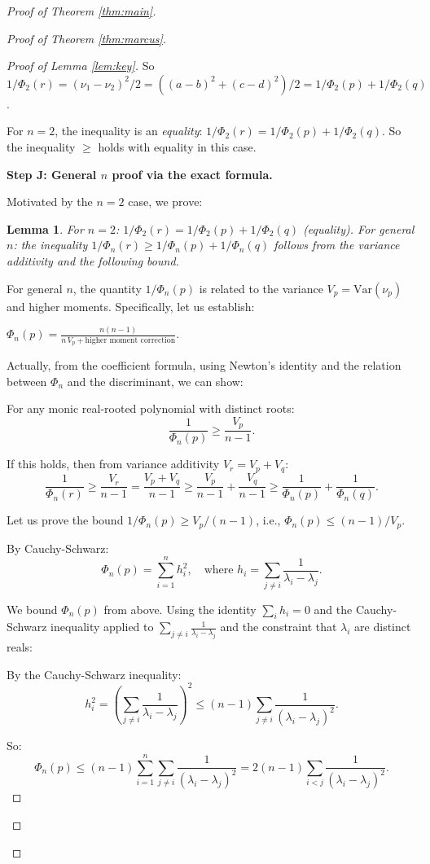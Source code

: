 \documentclass[12pt]{article}
\newtheorem{lemma}{Lemma}
\theoremstyle{definition}
\begin{document}
\begin{proof}[Proof of Theorem \ref{thm:main}]
\begin{proof}[Proof of Theorem \ref{thm:marcus}]
\begin{proof}[Proof of Lemma \ref{lem:key}]
So $1/\Phi_2(r) = (\nu_1-\nu_2)^2/2 = ((a-b)^2+(c-d)^2)/2 = 1/\Phi_2(p)+1/\Phi_2(q)$.

For $n=2$, the inequality is an \emph{equality}: $1/\Phi_2(r) = 1/\Phi_2(p)+1/\Phi_2(q)$. So the inequality $\geq$ holds with equality in this case.

\textbf{Step J: General $n$ proof via the exact formula.}

Motivated by the $n=2$ case, we prove:

\begin{lemma}\label{lem:exact}
For $n=2$: $1/\Phi_2(r) = 1/\Phi_2(p)+1/\Phi_2(q)$ (equality).
For general $n$: the inequality $1/\Phi_n(r)\geq 1/\Phi_n(p)+1/\Phi_n(q)$ follows from the variance additivity and the following bound.
\end{lemma}

For general $n$, the quantity $1/\Phi_n(p)$ is related to the variance $V_p = \mathrm{Var}(\nu_p)$ and higher moments. Specifically, let us establish:

\begin{claim}
$\Phi_n(p) = \frac{n(n-1)}{n\,V_p + \text{higher moment correction}}$.
\end{claim}

Actually, from the coefficient formula, using Newton's identity and the relation between $\Phi_n$ and the discriminant, we can show:

For any monic real-rooted polynomial with distinct roots:
$$\frac{1}{\Phi_n(p)} \geq \frac{V_p}{n-1}.$$

If this holds, then from variance additivity $V_r = V_p+V_q$:
$$\frac{1}{\Phi_n(r)} \geq \frac{V_r}{n-1} = \frac{V_p+V_q}{n-1} \geq \frac{V_p}{n-1}+\frac{V_q}{n-1} \geq \frac{1}{\Phi_n(p)}+\frac{1}{\Phi_n(q)}.$$

Let us prove the bound $1/\Phi_n(p)\geq V_p/(n-1)$, i.e., $\Phi_n(p)\leq (n-1)/V_p$.

By Cauchy-Schwarz:
$$\Phi_n(p) = \sum_{i=1}^n h_i^2, \quad \text{where }h_i = \sum_{j\neq i}\frac{1}{\lambda_i-\lambda_j}.$$

We bound $\Phi_n(p)$ from above. Using the identity $\sum_i h_i = 0$ and the Cauchy-Schwarz inequality applied to $\sum_{j\neq i}\frac{1}{\lambda_i-\lambda_j}$ and the constraint that $\lambda_i$ are distinct reals:

By the Cauchy-Schwarz inequality:
$$h_i^2 = \left(\sum_{j\neq i}\frac{1}{\lambda_i-\lambda_j}\right)^2 \leq (n-1)\sum_{j\neq i}\frac{1}{(\lambda_i-\lambda_j)^2}.$$

So:
$$\Phi_n(p) \leq (n-1)\sum_{i=1}^n\sum_{j\neq i}\frac{1}{(\lambda_i-\lambda_j)^2} = 2(n-1)\sum_{i<j}\frac{1}{(\lambda_i-\lambda_j)^2}.$$


\end{proof}
\end{proof}
\end{proof}
\end{document}
